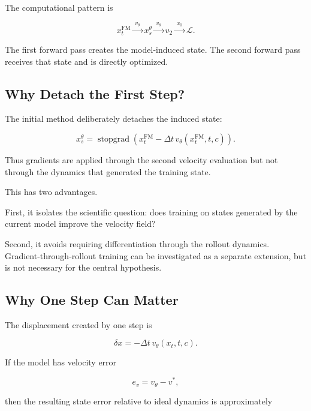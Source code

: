 \documentclass[11pt]{article}
\begin{document}
The computational pattern is

\begin{equation}
\boxed{
x_t^{\mathrm{FM}}
\xrightarrow{\;v_\theta\;}
x_s^\theta
\xrightarrow{\;v_\theta\;}
v_2
\xrightarrow{\;x_0\;}
\mathcal{L}.
}
\end{equation}

The first forward pass creates the model-induced state. The second forward
pass receives that state and is directly optimized.

\subsection{Why Detach the First Step?}

The initial method deliberately detaches the induced state:

\begin{equation}
x_s^\theta
=
\operatorname{stopgrad}
\left(
x_t^{\mathrm{FM}}
-
\Delta t\,v_\theta(x_t^{\mathrm{FM}},t,c)
\right).
\end{equation}

Thus gradients are applied through the second velocity evaluation but not
through the dynamics that generated the training state.

This has two advantages.

First, it isolates the scientific question: does training on states generated
by the current model improve the velocity field?

Second, it avoids requiring differentiation through the rollout dynamics.
Gradient-through-rollout training can be investigated as a separate extension,
but is not necessary for the central hypothesis.

\subsection{Why One Step Can Matter}

The displacement created by one step is

\begin{equation}
\delta x
=
-\Delta t\,v_\theta(x_t,t,c).
\end{equation}

If the model has velocity error

\begin{equation}
e_v
=
v_\theta-v^*,
\end{equation}

then the resulting state error relative to ideal dynamics is approximately
\end{document}
